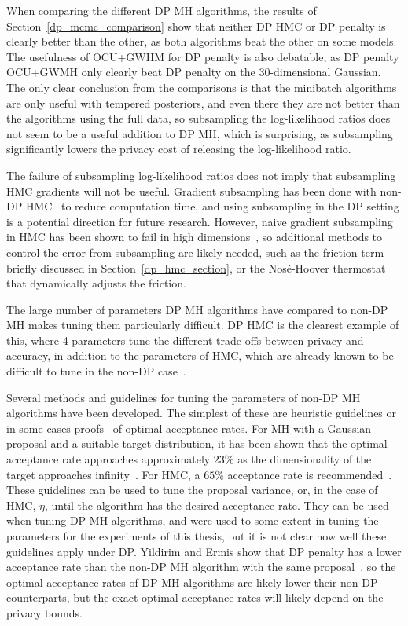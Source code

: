 \documentclass[english,twoside,openright]{HYgraduMLDS}
\begin{document}
When comparing the different DP MH algorithms, the results of
Section~\ref{dp_mcmc_comparison} show that neither DP HMC or DP penalty is
clearly better than the other, as both algorithms beat the other on some models.
The usefulness of OCU+GWHM for DP penalty is also debatable, as DP penalty
OCU+GWMH only clearly beat DP penalty on the 30-dimensional Gaussian. The only
clear conclusion from the comparisons is that the minibatch algorithms are
only useful with tempered posteriors, and even there they are not better
than the algorithms using the full data, so subsampling the log-likelihood ratios
does not seem to be a useful addition to DP MH, which is surprising, as
subsampling significantly lowers the privacy cost of releasing the log-likelihood
ratio.

The failure of subsampling log-likelihood ratios does not imply that subsampling
HMC gradients will not be useful. Gradient subsampling has been done with
non-DP HMC~\cite{CFG14, DFB14} to reduce computation time, and using subsampling
in the DP setting is a potential direction for future research. However,
naive gradient subsampling in HMC has been shown to fail in high
dimensions~\cite{Bet15}, so additional methods to control the error from subsampling
are likely needed, such as the friction term~\cite{CFG14} briefly discussed in
Section~\ref{dp_hmc_section}, or the Nosé-Hoover thermostat~\cite{DFB14} that
dynamically adjusts the friction.

The large number of parameters DP MH algorithms have compared to non-DP
MH makes tuning them particularly difficult. DP HMC is the clearest example
of this, where 4 parameters tune the different trade-offs between privacy and
accuracy, in addition to the parameters of HMC, which are already known to
be difficult to tune in the non-DP case~\cite{neal2012mcmc}.

Several methods and guidelines for tuning the parameters of non-DP MH algorithms
have been developed. The simplest of these are heuristic guidelines or in some
cases proofs~\cite{RGG97} of optimal acceptance rates. For MH with a Gaussian
proposal and a suitable target distribution, it has been shown that the optimal
acceptance rate approaches approximately \(23\%\) as the dimensionality of the
target approaches infinity~\cite{RGG97}. For HMC, a \(65\%\) acceptance rate
is recommended~\cite{neal2012mcmc}. These guidelines can be used to tune the
proposal variance,
or, in the case of HMC, \(\eta\), until the algorithm has the desired acceptance
rate. They can be used when tuning DP MH algorithms, and were used to some
extent in tuning the parameters for the experiments of this thesis, but it
is not clear how well these guidelines apply under DP.
Yildirim and Ermis show that DP penalty has a lower acceptance
rate than the non-DP MH algorithm with the same proposal~\cite{YildirimE19},
so the optimal
acceptance rates of DP MH algorithms are likely lower their non-DP
counterparts, but the exact optimal acceptance rates will likely depend on the
privacy bounds.
\end{document}
